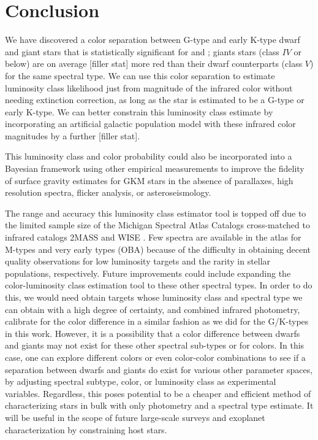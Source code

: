 \chapter{Conclusion}\label{chap:CONCLUSION}

We have discovered a color separation between G-type and early K-type dwarf and giant stars that is statistically significant for \jwone and \jwtwo; giants stars (class $IV$ or below) are on average [filler stat] more red than their dwarf counterparts (class $V$) for the same spectral type. We can use this color separation to estimate luminosity class likelihood just from magnitude of the infrared color without needing extinction correction, as long as the star is estimated to be a G-type or early K-type. We can better constrain this luminosity class estimate by incorporating an artificial galactic population model with these infrared color magnitudes by a further [filler stat].

This luminosity class and color probability could also be incorporated into a Bayesian framework using other empirical measurements to improve the fidelity of surface gravity estimates for GKM stars in the absence of parallaxes, high resolution spectra, flicker analysis, or asteroseismology. 

The range and accuracy this luminosity class estimator tool is topped off due to the limited sample size of the Michigan Spectral Atlas Catalogs \citep{Houk1975,Houk1978,Houk1982,Houk1988,Houk1999} cross-matched to infrared catalogs 2MASS \citep{2MASS} and WISE \citep{WISE}. Few spectra are available in the atlas for M-types and very early types (OBA) because of the difficulty in obtaining decent quality observations for low luminosity targets and the rarity in stellar populations, respectively. Future improvements could include expanding the color-luminosity class estimation tool to these other spectral types. In order to do this, we would need obtain targets whose luminosity class and spectral type we can obtain with a high degree of certainty, and combined  infrared photometry, calibrate for the color difference in a similar fashion as we did for the G/K-types in this work. However, it is a possibility that a color difference between dwarfs and giants may not exist for these other spectral sub-types or for colors. In this case, one can explore different colors or even color-color combinations to see if a separation between dwarfs and giants do exist for various other parameter spaces, by adjusting spectral subtype, color, or luminosity class as experimental variables. Regardless, this poses potential to be a cheaper and efficient method of characterizing stars in bulk with only photometry and a spectral type estimate. It will be useful in the scope of future large-scale surveys and exoplanet characterization by constraining host stars.